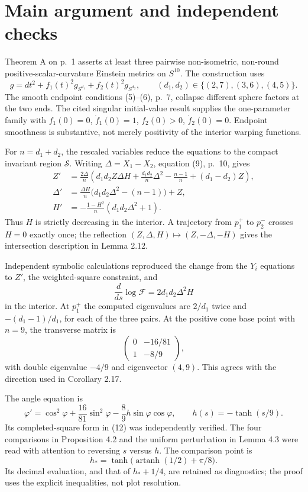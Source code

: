\documentclass[10pt]{article}
\begin{document}
\section*{Main argument and independent checks}
Theorem A on p. 1 asserts at least three pairwise non-isometric, non-round positive-scalar-curvature Einstein metrics on \(S^{10}\). The construction uses \[g=dt^2+f_1(t)^2g_{S^{d_1}}+f_2(t)^2g_{S^{d_2}},
 \qquad (d_1,d_2)\in\{(2,7),(3,6),(4,5)\}.\] The smooth endpoint conditions (5)–(6), p. 7, collapse different sphere factors at the two ends. The cited singular initial-value result supplies the one-parameter family with \(f_1(0)=0\), \(\dot f_1(0)=1\), \(f_2(0)>0\), \(\dot f_2(0)=0\). Endpoint smoothness is substantive, not merely positivity of the interior warping functions.\par
For \(n=d_1+d_2\), the rescaled variables reduce the equations to the compact invariant region \(\mathcal S\). Writing \(\Delta=X_1-X_2\), equation (9), p. 10, gives \[\begin{aligned}
 Z'&=\frac{2\Delta}{n}
 \left(d_1d_2 Z\Delta H+\frac{d_1d_2}{n}\Delta^2
       -\frac{n-1}{n}+(d_1-d_2)Z\right),\\
 \Delta'&=\frac{\Delta H}{n}
             \bigl(d_1d_2\Delta^2-(n-1)\bigr)+Z,\\
 H'&=-\frac{1-H^2}{n}(d_1d_2\Delta^2+1).\end{aligned}\] Thus \(H\) is strictly decreasing in the interior. A trajectory from \(p_1^+\) to \(p_2^-\) crosses \(H=0\) exactly once; the reflection \((Z,\Delta,H)\mapsto(Z,-\Delta,-H)\) gives the intersection description in Lemma 2.12.\par
Independent symbolic calculations reproduced the change from the \(Y_i\) equations to \(Z'\), the weighted-square constraint, and \[\frac{d}{ds}\log\mathcal F=2d_1d_2\Delta^2H\] in the interior. At \(p_1^+\) the computed eigenvalues are \(2/d_1\) twice and \(-(d_1-1)/d_1\), for each of the three pairs. At the positive cone base point with \(n=9\), the transverse matrix is \[\begin{pmatrix}0&-16/81\\1&-8/9\end{pmatrix},\] with double eigenvalue \(-4/9\) and eigenvector \((4,9)\). This agrees with the direction used in Corollary 2.17.\par
The angle equation is \[\varphi'=\cos^2\varphi+\frac{16}{81}\sin^2\varphi
              -\frac89 h\sin\varphi\cos\varphi,\qquad
 h(s)=-\tanh(s/9).\] Its completed-square form in (12) was independently verified. The four comparisons in Proposition 4.2 and the uniform perturbation in Lemma 4.3 were read with attention to reversing \(s\) versus \(h\). The comparison point is \[h_*=\tanh\bigl(\operatorname{artanh}(1/2)+\pi/8\bigr).\] Its decimal evaluation, and that of \(h_*+1/4\), are retained as diagnostics; the proof uses the explicit inequalities, not plot resolution.\par
\end{document}
